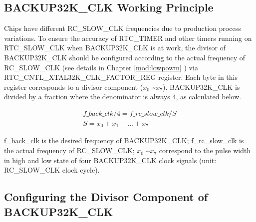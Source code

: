 \documentclass[main\_\_EN.tex]{subfiles}
\begin{document}
\subsection{BACKUP32K\_CLK Working Principle}\label{sec:xtwdt-divisor-config}
Chips have different RC\_SLOW\_CLK frequencies due to production process variations. To ensure the accuracy of RTC\_TIMER and other timers running on RTC\_SLOW\_CLK when BACKUP32K\_CLK is at work, the divisor of BACKUP32K\_CLK should be configured according to the actual frequency of RC\_SLOW\_CLK (see details in Chapter \ref{mod:lowpowm} \textit{}) via RTC\_CNTL\_XTAL32K\_CLK\_FACTOR\_REG register. Each byte  in this register corresponds to a divisor component (\begin{math}x_0\end{math} \textasciitilde \begin{math}x_7\end{math}). BACKUP32K\_CLK is divided by a fraction
where the denominator is always 4, as calculated below.

\begin{gather*}
f\_back\_clk / 4 = f\_rc\_slow\_clk/S \\
S = x_0 + x_1 + ... + x_7
\end{gather*}

f\_back\_clk is the desired frequency of BACKUP32K\_CLK; f\_rc\_slow\_clk is the actual frequency of RC\_SLOW\_CLK; \begin{math}x_0\end{math} \textasciitilde \begin{math}x_7\end{math} correspond to the pulse width in high and low state of four BACKUP32K\_CLK clock signals (unit: RC\_SLOW\_CLK clock cycle).

\subsection{Configuring the Divisor Component of BACKUP32K\_CLK}
\end{document}
